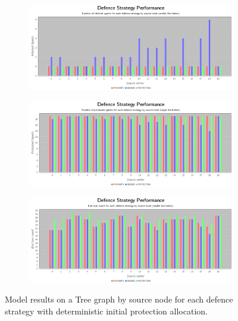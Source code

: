 \documentclass[results.tex]{subfiles}
\begin{document}
\begin{figure}[!ht]
\centering
     \begin{subfigure}[b]{0.9\textwidth}
         \centering
         \includegraphics[width=\textwidth]{Deterministic/DeterministicInfectedChart}
         \label{fig:tree-det-infected}
     \end{subfigure}
     \vfill
     \begin{subfigure}[b]{0.9\textwidth}
         \centering
         \includegraphics[width=\textwidth]{Deterministic/DeterministicProtectedChart}
         \label{fig:tree-det-protected}
     \end{subfigure}
     \vfill
     \begin{subfigure}[b]{0.9\textwidth}
         \centering
         \includegraphics[width=\textwidth]{Deterministic/DeterministicEndTurnChart}
         \label{fig:tree-det-end}
     \end{subfigure}
        \caption{Model results on a Tree graph by source node for each defence strategy with deterministic initial protection allocation.}
        \label{fig:tree-det-charts}
\end{figure}
\end{document}

